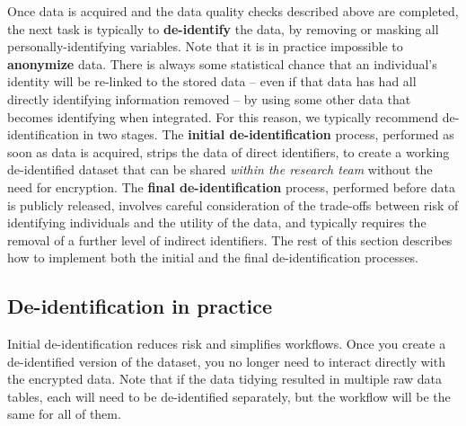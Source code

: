 Once data is acquired and the data quality checks described above are completed,
the next task is typically to \textbf{de-identify} the data,
by removing or masking all personally-identifying variables.
Note that it is in practice impossible to \textbf{anonymize} data.
There is always some statistical chance that an individual's identity
will be re-linked to the stored data
-- even if that data has had all directly identifying information removed --
by using some other data that becomes identifying when integrated.
For this reason, we typically recommend de-identification in two stages.
The \textbf{initial de-identification} process,
performed as soon as data is acquired, strips the data of direct identifiers,
to create a working de-identified dataset that
can be shared \textit{within the research team} without the need for encryption.
The \textbf{final de-identification} process,
performed before data is publicly released, involves
careful consideration of the trade-offs between
risk of identifying individuals and the utility of the data,
and typically requires the removal of a further level of indirect identifiers.
The rest of this section describes how to implement
both the initial and the final de-identification processes.

\subsection{De-identification in practice}

Initial de-identification reduces risk and simplifies workflows.
Once you create a de-identified version of the dataset,
you no longer need to interact directly with the encrypted data.
Note that if the data tidying resulted in multiple raw data tables,
each will need to be de-identified separately, but
the workflow will be the same for all of them.

